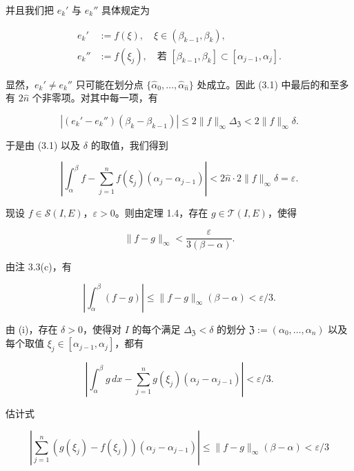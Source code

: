 \begin{theorem}
\begin{subitems}
并且我们把 $ e_k' $ 与 $ e_k'' $ 具体规定为

\begin{equation*}
\begin{aligned}
e_k' &:= f(\xi), \quad \xi \in (\beta_{k-1}, \beta_k) , \\ e_k'' &:= f(\xi_j), \quad \text{若 } [\beta_{k-1}, \beta_k] \subset [\alpha_{j-1}, \alpha_j] .
\end{aligned}
\end{equation*}

显然，$ e_k' \ne e_k'' $ 只可能在划分点 $ \{\widehat{\alpha}_0, \ldots, \widehat{\alpha}_{\hat{n}}\} $ 处成立。因此 (3.1) 中最后的和至多有 $ 2\hat{n} $ 个非零项。对其中每一项，有

\[
|(e_k' - e_k'')(\beta_k - \beta_{k-1})| \le 2\|f\|_{\infty}\Delta_{\mathfrak{Z}} < 2\|f\|_{\infty}\delta .
\]

于是由 (3.1) 以及 $ \delta $ 的取值，我们得到

\[
\left| \int_{\alpha}^{\beta} f - \sum_{j=1}^{n} f(\xi_j)(\alpha_j - \alpha_{j-1}) \right| < 2\hat{n} \cdot 2\|f\|_{\infty}\delta = \varepsilon .
\]
\item

现设 $ f \in \mathcal{S}(I, E) $，$ \varepsilon > 0 $。则由定理 1.4，存在 $ g \in \mathcal{T}(I, E) $，使得

\begin{equation}
\|f - g\|_{\infty} < \frac{\varepsilon}{3(\beta - \alpha)} .\tag{3.2}
\end{equation}

由注 3.3(c)，有

\begin{equation}
\left| \int_{\alpha}^{\beta} (f - g) \right| \le \|f - g\|_{\infty}(\beta - \alpha) < \varepsilon/3 .\tag{3.3}
\end{equation}

由 (i)，存在 $ \delta > 0 $，使得对 $ I $ 的每个满足 $ \Delta_{\mathfrak{Z}} < \delta $ 的划分 $ \mathfrak{Z} := (\alpha_0, \ldots, \alpha_n) $ 以及每个取值 $ \xi_j \in [\alpha_{j-1}, \alpha_j] $，都有

\begin{equation}
\left| \int_{\alpha}^{\beta} g \, dx - \sum_{j=1}^{n} g(\xi_j)(\alpha_j - \alpha_{j-1}) \right| < \varepsilon/3 .\tag{3.4}
\end{equation}

估计式

\begin{equation}
\left| \sum_{j=1}^{n} (g(\xi_j) - f(\xi_j))(\alpha_j - \alpha_{j-1}) \right| \le \|f - g\|_{\infty}(\beta - \alpha) < \varepsilon/3\tag{3.5}
\end{equation}


\end{subitems}
\end{theorem}
